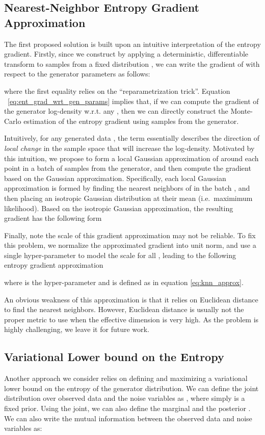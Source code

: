 \documentclass[a4paper]{article}
\begin{document}
\subsection{Nearest-Neighbor Entropy Gradient Approximation}
The first proposed solution is built upon an intuitive interpretation of the entropy gradient.
Firstly, since we construct  by applying a deterministic, differentiable transform  to samples  from a fixed distribution , we can write the gradient of  with respect to the generator parameters  as follows:

where the first equality relies on the ``reparametrization trick''. 
Equation ~\ref{eq:ent_grad_wrt_gen_params} implies that, if we can compute the gradient of the generator log-density  w.r.t. any , then we can directly construct the Monte-Carlo estimation of the entropy gradient  using samples from the generator.

Intuitively, for any generated data , the term  essentially describes the direction of \textit{local change}
in the sample space that will increase the log-density.
Motivated by this intuition, we propose to form a local Gaussian approximation  of  around each point  in a batch of samples  from the generator, and then compute the gradient  based on the Gaussian approximation. 
Specifically, each local Gaussian approximation  is formed by finding the  nearest neighbors of  in the batch , and then placing an isotropic Gaussian distribution at their mean (i.e.~maximimum likelihood).
Based on the isotropic Gaussian approximation, the resulting gradient has the following form

Finally, note the scale of this gradient approximation may not be reliable.
To fix this problem, we normalize the approximated gradient into unit norm, and use a single hyper-parameter to model the scale for all , leading to the following entropy gradient approximation

where  is the hyper-parameter and  is defined as in equation \eqref{eq:knn_approx}.

An obvious weakness of this approximation is that it relies on Euclidean distance to find the  nearest neighbors.
However, Euclidean distance is usually not the proper metric to use when the effective dimension is very high.
As the problem is highly challenging, we leave it for future work. 



\subsection{Variational Lower bound on the Entropy}
Another approach we consider relies on defining and maximizing a variational lower bound on the entropy  of the generator distribution.
We can define the joint distribution over observed data and the noise variables as , where simply  is a fixed prior. Using the joint, we can also define the marginal  and the posterior .
We can also write the mutual information between the observed data and noise variables as:
\end{document}
